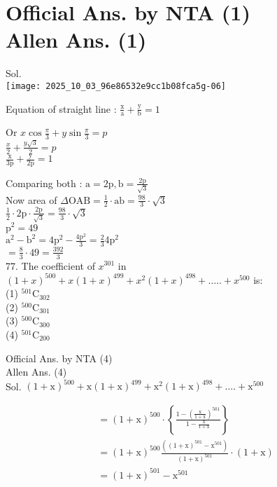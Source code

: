 \documentclass[10pt]{article}
\begin{document}
\section*{Official Ans. by NTA (1) \\
 Allen Ans. (1)}
Sol.\\
\texttt{[image: 2025\_10\_03\_96e86532e9cc1b08fca5g-06]}

Equation of straight line : \(\frac{\mathrm{x}}{\mathrm{a}}+\frac{\mathrm{y}}{\mathrm{b}}=1\)

Or \(x \cos \frac{\pi}{3}+y \sin \frac{\pi}{3}=p\)\\
\(\frac{x}{2}+\frac{y \sqrt{3}}{2}=p\)\\
\(\frac{\mathrm{x}}{3 \mathrm{p}}+\frac{\mathrm{y}}{2 \mathrm{p}}=1\)

Comparing both : \(\mathrm{a}=2 \mathrm{p}, \mathrm{b}=\frac{2 \mathrm{p}}{\sqrt{3}}\)\\
Now area of \(\Delta \mathrm{OAB}=\frac{1}{2} \cdot \mathrm{ab}=\frac{98}{3} \cdot \sqrt{3}\)\\
\(\frac{1}{2} \cdot 2 \mathrm{p} \cdot \frac{2 \mathrm{p}}{\sqrt{3}}=\frac{98}{3} \cdot \sqrt{3}\)\\
\(\mathrm{p}^{2}=49\)\\
\(\mathrm{a}^{2}-\mathrm{b}^{2}=4 \mathrm{p}^{2}-\frac{4 \mathrm{p}^{2}}{3}=\frac{2}{3} 4 \mathrm{p}^{2}\)\\
\(=\frac{8}{3} \cdot 49=\frac{392}{3}\)\\
77. The coefficient of \(x^{301}\) in \((1+x)^{500}+x(1+x)^{499}+x^{2}(1+x)^{498}+\ldots . .+x^{500}\) is:\\
(1) \({ }^{501} \mathrm{C}_{302}\)\\
(2) \({ }^{500} \mathrm{C}_{301}\)\\
(3) \({ }^{500} \mathrm{C}_{300}\)\\
(4) \({ }^{501} \mathrm{C}_{200}\)

Official Ans. by NTA (4)\\
Allen Ans. (4)\\
Sol. \((1+\mathrm{x})^{500}+\mathrm{x}(1+\mathrm{x})^{499}+\mathrm{x}^{2}(1+\mathrm{x})^{498}+\ldots .+\mathrm{x}^{500}\)

\[
\begin{aligned}
& =(1+\mathrm{x})^{500} \cdot\left\{\frac{1-\left(\frac{\mathrm{x}}{1+\mathrm{x}}\right)^{501}}{1-\frac{\mathrm{x}}{1+\mathrm{x}}}\right\} \\
& =(1+\mathrm{x})^{500} \frac{\left((1+\mathrm{x})^{501}-\mathrm{x}^{501}\right)}{(1+\mathrm{x})^{501}} \cdot(1+\mathrm{x}) \\
& =(1+\mathrm{x})^{501}-\mathrm{x}^{501}
\end{aligned}
\]
\end{document}
